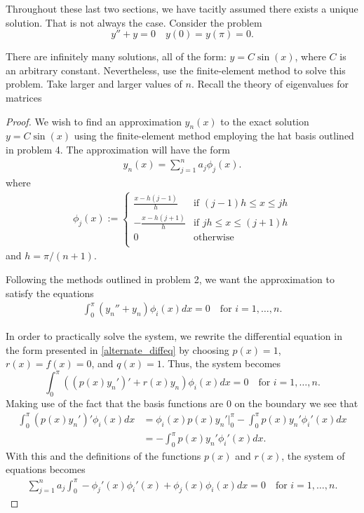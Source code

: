 \begin{problem}
  Throughout these last two sections, we have tacitly assumed there exists a unique
  solution. That is not always the case. Consider the problem
  \[
    y'' + y = 0 \quad y(0) = y(\pi) = 0.
  \]

  There are infinitely many solutions, all of the form: $y = C\sin(x)$, where $C$
  is an arbitrary constant. Nevertheless, use the finite-element method to solve
  this problem. Take larger and larger values of $n$. Recall the theory of
  eigenvalues for matrices
\end{problem}

\begin{proof}
  We wish to find an approximation $y_n(x)$ to the exact solution $y = C\sin(x)$
  using the finite-element method employing the hat basis outlined in problem 4.
  The approximation will have the form
  \begin{align*}
    y_n(x) = \sum_{j=1}^n a_j \phi_j(x).
  \end{align*}
  where
  \begin{align*}
    \phi_j(x) :=
    \begin{cases}
      \frac{x - h(j-1)}{h} & \text{if $(j-1)h \leq x \leq jh$} \\
      -\frac{x - h(j+1)}{h} & \text{if $jh \leq x \leq (j + 1)h$} \\
      0 & \text{otherwise} \\
    \end{cases}
  \end{align*}
  and $h = \pi / (n + 1)$.

  Following the methods outlined in problem 2, we want the approximation to
  satisfy the equations
  \begin{align*}
    \int_0^\pi (y_n'' + y_n)\phi_i(x)dx = 0 \quad \text{for $i = 1,\dots,n$}.
  \end{align*}

  In order to practically solve the system, we rewrite the differential
  equation in the form presented in \eqref{alternate_diffeq} by
  choosing $p(x) = 1$, $r(x) = f(x) = 0$, and $q(x) = 1$. Thus,
  the system becomes
  \[
    \int_0^\pi ((p(x)y_n')' + r(x)y_n)\phi_i(x) dx = 0 \quad \text{for $i=1,\dots,n$}.
  \]
  Making use of the fact that the basis functions are 0 on the boundary we see that
  \begin{align*}
    \int_0^\pi (p(x)y_n')'\phi_i(x) dx
    &= \phi_i(x)p(x)y_n'\rvert_0^\pi - \int_0^\pi p(x)y_n'\phi_i'(x) dx \\
    &= - \int_0^\pi p(x)y_n'\phi_i'(x) dx.
  \end{align*}
  With this and the definitions of the functions $p(x)$ and $r(x)$,
  the system of equations becomes
  \begin{align}\label{system_imp}
    \sum_{j=1}^n a_j \int_0^\pi -\phi_j'(x)\phi_i'(x) + \phi_j(x)\phi_i(x) dx = 0\quad \text{for $i=1,\dots,n$}.
  \end{align}


\end{proof}
